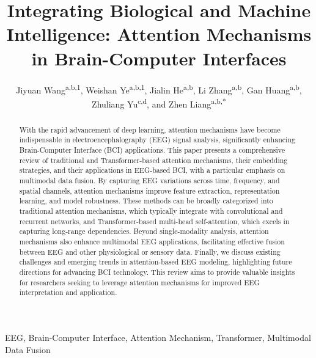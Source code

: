\documentclass[preprint,12pt]{elsarticle}
\begin{document}
\begin{frontmatter}

\title{Integrating Biological and Machine Intelligence: Attention Mechanisms in Brain-Computer Interfaces}

\author{Jiyuan Wang\textsuperscript{a,b,1},
Weishan Ye\textsuperscript{a,b,1}, Jialin He\textsuperscript{a,b}, Li Zhang\textsuperscript{a,b}, Gan Huang\textsuperscript{a,b},\\ Zhuliang Yu\textsuperscript{c,d}, and Zhen Liang\textsuperscript{a,b,*}} %



\begin{abstract}
With the rapid advancement of deep learning, attention mechanisms have become indispensable in electroencephalography (EEG) signal analysis, significantly enhancing Brain-Computer Interface (BCI) applications. This paper presents a comprehensive review of traditional and Transformer-based attention mechanisms, their embedding strategies, and their applications in EEG-based BCI, with a particular emphasis on multimodal data fusion. By capturing EEG variations across time, frequency, and spatial channels, attention mechanisms improve feature extraction, representation learning, and model robustness. These methods can be broadly categorized into traditional attention mechanisms, which typically integrate with convolutional and recurrent networks, and Transformer-based multi-head self-attention, which excels in capturing long-range dependencies. Beyond single-modality analysis, attention mechanisms also enhance multimodal EEG applications, facilitating effective fusion between EEG and other physiological or sensory data. Finally, we discuss existing challenges and emerging trends in attention-based EEG modeling, highlighting future directions for advancing BCI technology. This review aims to provide valuable insights for researchers seeking to leverage attention mechanisms for improved EEG interpretation and application.
\end{abstract}


\begin{keyword}
EEG, Brain-Computer Interface, Attention Mechanism, Transformer, Multimodal Data Fusion
\end{keyword}

\end{frontmatter}
\end{document}
